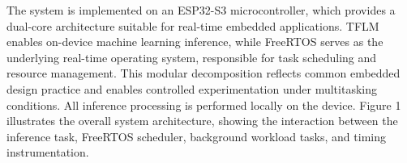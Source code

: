 \documentclass[conference]{IEEEtran}
\begin{document}
The system is implemented on an ESP32-S3 microcontroller, which provides a dual-core architecture suitable for real-time embedded applications. 
TFLM %
enables on-device machine learning inference, while FreeRTOS serves as the underlying real-time operating system, responsible for task scheduling and resource management.
This modular decomposition reflects common embedded design practice and enables controlled experimentation under multitasking conditions. All inference processing is performed locally on the device. %
Figure 1 illustrates the overall system architecture, showing the interaction between the inference task, FreeRTOS scheduler, background workload tasks, and timing instrumentation. 
\end{document}
